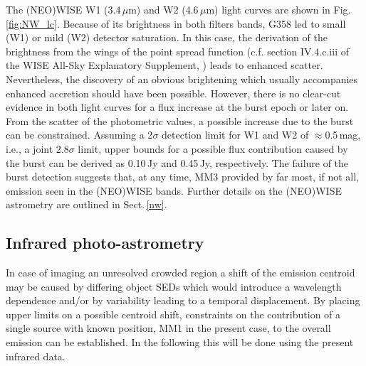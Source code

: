 The (NEO)WISE W1 (3.4\,$\mu$m) and W2 (4.6\,$\mu$m) light curves are shown in Fig.\,\ref{fig:NW_lc}. 
Because of its brightness in both filters bands, G358 led to small (W1) or mild (W2) detector saturation. In this case, the derivation of the brightness from the wings of the point spread function (c.f. section IV.4.c.iii of the WISE All-Sky Explanatory Supplement, \citealp{2012wise.rept....1C}) leads to enhanced scatter. 
Nevertheless, the discovery of an 
obvious brightening which usually accompanies enhanced accretion should have been possible. However, there is no clear-cut evidence in both light curves for a flux increase at the burst epoch or later on.
From the scatter of the photometric values, a possible increase due to the burst can be constrained. Assuming a 2$\sigma$ detection limit for W1 and W2 of $\approx$0.5\,mag, i.e., a joint 2.8$\sigma$ limit, upper bounds for a possible flux contribution caused by the burst can be derived as 0.10\,Jy and 0.45\,Jy, respectively. 
The failure of the burst detection suggests that, at any time, MM3 provided by far most, if not all, emission seen in the (NEO)WISE bands. Further details on the (NEO)WISE astrometry are outlined in Sect.\,\ref{nw}.

\subsection{Infrared photo-astrometry}\label{iras}
In case of imaging an unresolved crowded region a shift of the emission centroid may be caused by differing object SEDs which would introduce a wavelength dependence and/or by variability leading to a temporal displacement. By placing upper limits on a possible centroid shift, constraints on the contribution of a single source with known position, MM1 in the present case, to the overall emission can be established. In the following this will be done using %
the present infrared data.

